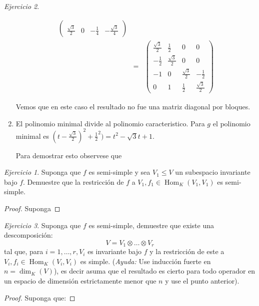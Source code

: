 \documentclass[11pt,a4paper]{article}
\theoremstyle{definition}
\theoremstyle{remark}
\newtheorem{exc}{Ejercicio}
\newcommand{\Hom}{\operatorname{Hom}}
\begin{document}
\begin{exc}
\begin{enumerate}
\begin{eqnarray}
\begin{pmatrix}
		\\ \frac{\sqrt{3}}{2} & 0 & -\frac{1}{4} & -\frac{\sqrt{3}}{4}
		\end{pmatrix} \nonumber 
		\\ & = &
		\begin{pmatrix}
		\frac{\sqrt{3}}{2} & \frac{1}{2} & 0 & 0
		\\ -\frac{1}{2} & \frac{\sqrt{3}}{2} & 0 & 0
		\\ -1 & 0 & \frac{\sqrt{3}}{2} & -\frac{1}{2}  
		\\ 0 & 1 & \frac{1}{2} & \frac{\sqrt{3}}{2}
		\end{pmatrix} \nonumber 
		\end{eqnarray}
		
		Vemos que en este caso el resultado no fue una matriz diagonal por bloques.
		
		\item El polinomio minimal divide al polinomio caracteristico.
		Para $ g $ el polinomio minimal es $ (t-\frac{\sqrt{3}}{2})^2+\frac{1}{2}^2) = t^2 -\sqrt{3}t+1$.
		
		Para demostrar esto observese que 
	\end{enumerate}
	
	 
	\begin{exc}
		Suponga que $ f $ es semi-simple y sea $ V_1 \leq V $ un subespacio invariante bajo $ f $. Demuestre que la restricción de $ f $ a $ V_1, f_1 \in \Hom_K (V_1,V_1) $ es semi-simple.
	\end{exc}
	

	 
\end{exc}


\begin{proof}
		Suponga
\end{proof}	

\begin{exc}
	Suponga que $ f $ es semi-simple, demuestre que existe una descomposición:
	\[ V = V_1 \otimes \ldots \otimes V_r \]
	tal que, para $ i = 1, \ldots, r, V_i $ es invariante bajo $ f $ y la restricción de este a $ V_i, f_i \in \Hom_K (V_i, V_i) $ es simple. (\textit{Ayuda: } Use inducción fuerte en $ n = \dim_K (V) $), es decir asuma que el resultado es cierto para todo operador en un espacio de dimensión estrictamente menor que $ n $ y use el punto anterior).
\end{exc}

\begin{proof}
	Suponga que:
\end{proof}
\end{document}
